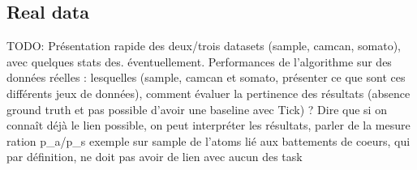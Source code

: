 \subsection{Real data}\label{res_real_data}

TODO: Présentation rapide des deux/trois datasets (sample, camcan, somato), avec quelques stats des. éventuellement.
Performances de l'algorithme sur des données réelles : lesquelles (sample, camcan et somato, présenter ce que sont ces différents jeux de données), comment évaluer la pertinence des résultats (absence ground truth et pas possible d'avoir une baseline avec Tick) ?
Dire que si on connaît déjà le lien possible, on peut interpréter les résultats, parler de la mesure ration p\_a/p\_s
exemple sur sample de l'atoms lié aux battements de coeurs, qui par définition, ne doit pas avoir de lien avec aucun des task
